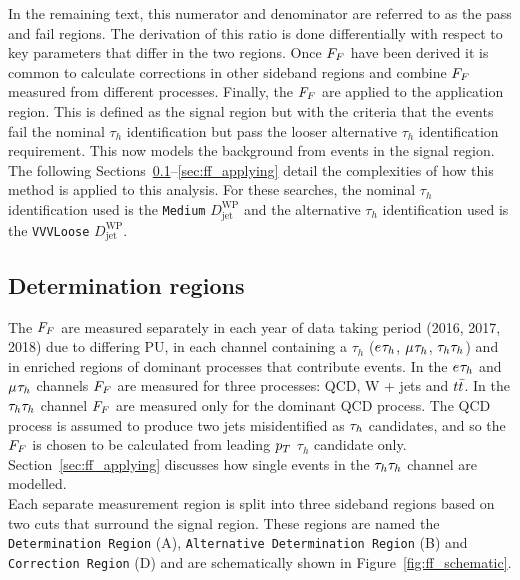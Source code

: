 In the remaining text, this numerator and denominator are referred to as the pass and fail regions.
The derivation of this ratio is done differentially with respect to key parameters that differ in the two regions.
Once $F_{F}$ have been derived it is common to calculate corrections in other sideband regions and combine $F_{F}$ measured from different processes.
Finally, the $F_{F}$ are applied to the application region. 
This is defined as the signal region but with the criteria that the \jtth events fail the nominal $\tau_h$ identification but pass the looser alternative $\tau_h$ identification requirement.
This now models the background from \jtth events in the signal region. \\

The following Sections~\ref{sec:ff_dr}--\ref{sec:ff_applying} detail the complexities of how this method is applied to this analysis.
For these searches, the nominal $\tau_h$ identification used is the \texttt{Medium} $D_{\text{jet}}^{\text{WP}}$ and the alternative $\tau_h$ identification used is the \texttt{VVVLoose} $D_{\text{jet}}^{\text{WP}}$.

\subsection{Determination regions}
\label{sec:ff_dr}

The $F_{F}$ are measured separately in each year of data taking period (2016, 2017, 2018) due to differing \ac{PU}, in each channel containing a $\tau_h$ ($e_{}\tau_{h}$, $\mu_{}\tau_{h}$, $\tau_{h}\tau_{h}$) and in enriched regions of dominant processes that contribute \jtth events.
In the $e_{}\tau_{h}$ and $\mu_{}\tau_{h}$ channels $F_{F}$ are measured for three processes: \ac{QCD}, W + jets and $t\bar{t}$.
In the $\tau_{h}\tau_{h}$ channel $F_{F}$ are measured only for the dominant \ac{QCD} process.
The \ac{QCD} process is assumed to produce two jets misidentified as $\tau_{h}$ candidates, and so the $F_{F}$ is chosen to be calculated from leading $p_{T}$ $\tau_h$ candidate only.
Section~\ref{sec:ff_applying} discusses how single \jtth events in the $\tau_{h}\tau_{h}$ channel are modelled. \\

Each separate measurement region is split into three sideband regions based on two cuts that surround the signal region.
These regions are named the \texttt{Determination Region} (A), \texttt{Alternative Determination Region} (B) and \texttt{Correction Region} (D) and are schematically shown in Figure~\ref{fig:ff_schematic}. \\

